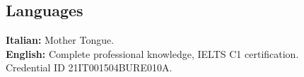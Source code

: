 \documentclass[margin, 10pt]{res}
\begin{document}
\begin{resume}

\section{Languages}
\textbf{Italian: } Mother Tongue. \\
\textbf{English: } Complete professional knowledge, IELTS C1 certification.
\\Credential ID 21IT001504BURE010A.\\

\end{resume}
\end{document}
